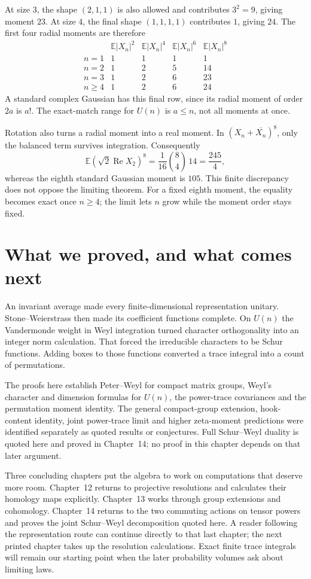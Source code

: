 At size $3$, the shape $(2,1,1)$ is also allowed and contributes $3^2=9$, giving moment $23$. At size $4$, the final shape $(1,1,1,1)$ contributes $1$, giving $24$. The first four radial moments are therefore
\[
\begin{array}{c|rrrr}
 &\mathbb E|X_n|^2&\mathbb E|X_n|^4&\mathbb E|X_n|^6&\mathbb E|X_n|^8\\\hline
 n=1&1&1&1&1\\
 n=2&1&2&5&14\\
 n=3&1&2&6&23\\
 n\ge4&1&2&6&24
\end{array}
\]
A standard complex Gaussian has this final row, since its radial moment of order $2a$ is $a!$. The exact-match range for $U(n)$ is $a\le n$, not all moments at once.

Rotation also turns a radial moment into a real moment. In $(X_n+\overline{X_n})^8$, only the balanced term survives integration. Consequently
\[
 \mathbb E(\sqrt2\operatorname{Re}X_2)^8
   =\frac1{16}\binom84\,14=\frac{245}{4},
\]
whereas the eighth standard Gaussian moment is $105$. This finite discrepancy does not oppose the limiting theorem. For a fixed eighth moment, the equality becomes exact once $n\ge4$; the limit lets $n$ grow while the moment order stays fixed.

\section{What we proved, and what comes next}

An invariant average made every finite-dimensional representation unitary. Stone--Weierstrass then made its coefficient functions complete. On $U(n)$ the Vandermonde weight in Weyl integration turned character orthogonality into an integer norm calculation. That forced the irreducible characters to be Schur functions. Adding boxes to those functions converted a trace integral into a count of permutations.

The proofs here establish Peter--Weyl for compact matrix groups, Weyl's character and dimension formulas for $U(n)$, the power-trace covariances and the permutation moment identity. The general compact-group extension, hook-content identity, joint power-trace limit and higher zeta-moment predictions were identified separately as quoted results or conjectures. Full Schur--Weyl duality is quoted here and proved in Chapter~14; no proof in this chapter depends on that later argument.

Three concluding chapters put the algebra to work on computations that deserve more room. Chapter~12 returns to projective resolutions and calculates their homology maps explicitly. Chapter~13 works through group extensions and cohomology. Chapter~14 returns to the two commuting actions on tensor powers and proves the joint Schur--Weyl decomposition quoted here. A reader following the representation route can continue directly to that last chapter; the next printed chapter takes up the resolution calculations. Exact finite trace integrals will remain our starting point when the later probability volumes ask about limiting laws.

